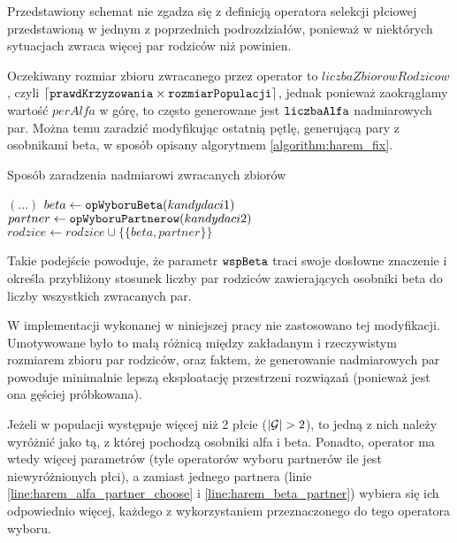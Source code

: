 \documentclass[./FM_mgr.tex]{subfiles}
\begin{document}
Przedstawiony schemat nie zgadza się z definicją operatora selekcji płciowej przedstawioną w jednym z poprzednich podrozdziałów, ponieważ w niektórych sytuacjach zwraca więcej par rodziców niż powinien. 

Oczekiwany rozmiar zbioru zwracanego przez operator to $liczbaZbiorowRodzicow$, czyli $\lceil \mathtt{prawdKrzyzowania} \times \mathtt{rozmiarPopulacji} \rceil$, jednak ponieważ zaokrąglamy wartość $perAlfa$ w górę, to często generowane jest $\mathtt{liczbaAlfa}$ nadmiarowych par.
Można temu zaradzić modyfikując ostatnią pętlę, generującą pary z osobnikami beta, w sposób opisany algorytmem \ref{algorithm:harem_fix}.

\begin{algorithm}
	\caption{Sposób zaradzenia nadmiarowi zwracanych zbiorów \label{algorithm:harem_fix}}
	\begin{algorithmic}[1]
		\Start
		\State $(\dots)$
		\setcounter{ALG@line}{14}
		\Var $beta \gets \mathtt{opWyboruBeta}(kandydaci1)$
		\Var $partner \gets \mathtt{opWyboruPartnerow}(kandydaci2)$
		\State $rodzice \gets rodzice \cup \{ \{ beta, partner \} \}$
		\EndWhile
		\State {}
		\EndOperator
	\end{algorithmic}
\end{algorithm}

Takie podejście powoduje, że parametr $\mathtt{wspBeta}$ traci swoje dosłowne znaczenie i określa przybliżony stosunek liczby par rodziców zawierających osobniki beta do liczby wszystkich zwracanych par.

W implementacji wykonanej w niniejszej pracy nie zastosowano tej modyfikacji.
Umotywowane było to małą różnicą między zakładanym i rzeczywistym rozmiarem zbioru par rodziców, oraz faktem, że  generowanie nadmiarowych par powoduje minimalnie lepszą eksploatację przestrzeni rozwiązań (ponieważ jest ona gęściej próbkowana).

Jeżeli w populacji występuje więcej niż 2 płcie ($|\mathcal{G}| > 2$), to jedną z nich należy wyróżnić jako tą, z której pochodzą osobniki alfa i beta. 
Ponadto, operator ma wtedy więcej parametrów (tyle operatorów wyboru partnerów ile jest niewyróżnionych płci), a zamiast jednego partnera (linie \ref{line:harem_alfa_partner_choose} i \ref{line:harem_beta_partner}) wybiera się ich odpowiednio więcej, każdego z wykorzystaniem przeznaczonego do tego operatora wyboru.
\end{document}
